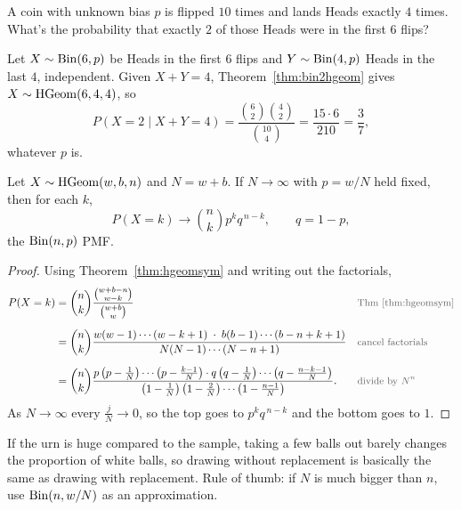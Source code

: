 \bigskip

\begin{example}
A coin with unknown bias $p$ is flipped $10$ times and lands Heads exactly $4$ times. What's the probability that exactly $2$ of those Heads were in the first $6$ flips?
\end{example}

\medskip

\begin{solution}
Let $X \sim \operatorname{Bin}(6, p)$ be Heads in the first $6$ flips and $Y \sim \operatorname{Bin}(4, p)$ Heads in the last $4$, independent. Given $X + Y = 4$, Theorem~\ref{thm:bin2hgeom} gives $X \sim \operatorname{HGeom}(6, 4, 4)$, so
\medskip
\[
P(X = 2 \mid X + Y = 4) = \frac{\binom{6}{2}\binom{4}{2}}{\binom{10}{4}} = \frac{15 \cdot 6}{210} = \frac{3}{7},
\]
\medskip
whatever $p$ is.
\end{solution}

\bigskip

\begin{theorem}\label{thm:hgeom2bin}
Let $X \sim \operatorname{HGeom}(w, b, n)$ and $N = w + b$. If $N \to \infty$ with $p = w/N$ held fixed, then for each $k$,
\medskip
\[
P(X = k) \to \binom{n}{k} p^{k} q^{\,n-k}, \qquad q = 1 - p,
\]
\medskip
the $\operatorname{Bin}(n, p)$ PMF.
\end{theorem}

\medskip

\begin{proof}
Using Theorem~\ref{thm:hgeomsym} and writing out the factorials,
\medskip
\begin{align*}
P(X = k)
  &= \binom{n}{k} \frac{\binom{w+b-n}{w-k}}{\binom{w+b}{w}}
  && \by{Thm~\ref{thm:hgeomsym}} \\[0.6em]
  &= \binom{n}{k} \frac{w(w-1)\cdots(w-k+1)\; \cdot\; b(b-1)\cdots(b-n+k+1)}{N(N-1)\cdots(N-n+1)}
  && \by{cancel factorials} \\[0.6em]
  &= \binom{n}{k} \frac{p\left(p - \frac{1}{N}\right)\cdots\left(p - \frac{k-1}{N}\right) \cdot q\left(q - \frac{1}{N}\right)\cdots\left(q - \frac{n-k-1}{N}\right)}{\left(1 - \frac{1}{N}\right)\left(1 - \frac{2}{N}\right)\cdots\left(1 - \frac{n-1}{N}\right)}.
  && \by{divide by $N^{n}$}
\end{align*}
\medskip
As $N \to \infty$ every $\tfrac{j}{N} \to 0$, so the top goes to $p^{k}q^{\,n-k}$ and the bottom goes to $1$.
\end{proof}

\bigskip

\begin{intuition}
If the urn is huge compared to the sample, taking a few balls out barely changes the proportion of white balls, so drawing without replacement is basically the same as drawing with replacement. Rule of thumb: if $N$ is much bigger than $n$, use $\operatorname{Bin}(n, w/N)$ as an approximation.
\end{intuition}

